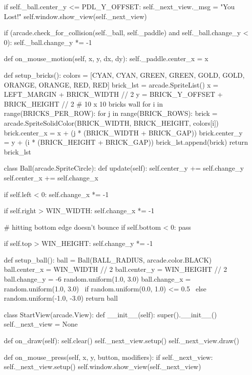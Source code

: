 \begin{py}
        if self._ball.center_y <= PDL_Y_OFFSET:
            self._next_view._msg = "You Lost!"
            self.window.show_view(self._next_view)

        if (arcade.check_for_collision(self._ball, self._paddle)
                and self._ball.change_y < 0):
            self._ball.change_y *= -1

    def on_mouse_motion(self, x, y, dx, dy):
        self._paddle.center_x = x


def setup_bricks():
    colors = [CYAN, CYAN, GREEN, GREEN, GOLD, GOLD,
              ORANGE, ORANGE, RED, RED]
    brick_lst = arcade.SpriteList()
    x = LEFT_MARGIN + BRICK_WIDTH // 2
    y = BRICK_Y_OFFSET + BRICK_HEIGHT // 2
    # 10 x 10 bricks wall
    for i in range(BRICKS_PER_ROW):
        for j in range(BRICK_ROWS):
            brick = arcade.SpriteSolidColor(BRICK_WIDTH,
                                            BRICK_HEIGHT,
                                            colors[i])
            brick.center_x = x + (j * (BRICK_WIDTH + BRICK_GAP))
            brick.center_y = y + (i * (BRICK_HEIGHT + BRICK_GAP))
            brick_lst.append(brick)
    return brick_lst


class Ball(arcade.SpriteCircle):
    def update(self):
        self.center_y += self.change_y
        self.center_x += self.change_x

        if self.left < 0:
            self.change_x *= -1

        if self.right > WIN_WIDTH:
            self.change_x *= -1

        # hitting bottom edge doesn't bounce
        if self.bottom < 0:
            pass

        if self.top > WIN_HEIGHT:
            self.change_y *= -1


def setup_ball():
    ball = Ball(BALL_RADIUS, arcade.color.BLACK)
    ball.center_x = WIN_WIDTH // 2
    ball.center_y = WIN_HEIGHT // 2
    ball.change_y = -6
    random.uniform(1.0, 3.0)
    ball.change_x = random.uniform(1.0, 3.0) \
        if random.uniform(0.0, 1.0) <= 0.5 \
        else random.uniform(-1.0, -3.0)
    return ball


class StartView(arcade.View):
    def __init__(self):
        super().__init__()
        self._next_view = None

    def on_draw(self):
        self.clear()
        self._next_view.setup()
        self._next_view.draw()

    def on_mouse_press(self, x, y, button, modifiers):
        if self._next_view:
            self._next_view.setup()
            self.window.show_view(self._next_view)



\end{py}
